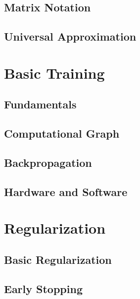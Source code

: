 \documentclass[13pt,compress]{beamer}
\begin{document}
\subsection{Matrix Notation}

\subsection{Universal Approximation}

\section{Basic Training}
\subsection{Fundamentals}

\subsection{Computational Graph}

\subsection{Backpropagation}


\subsection{Hardware and Software}

\section{Regularization}
\subsection{Basic Regularization}

\subsection{Early Stopping}

\end{document}
